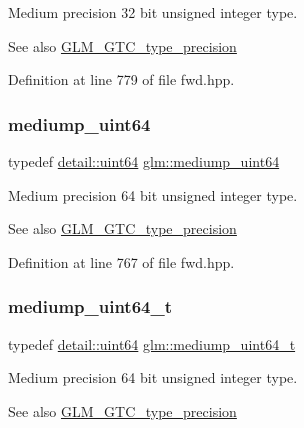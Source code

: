 Medium precision 32 bit unsigned integer type. \begin{DoxySeeAlso}{See also}
\mbox{\hyperlink{group__gtc__type__precision}{G\+L\+M\+\_\+\+G\+T\+C\+\_\+type\+\_\+precision}} 
\end{DoxySeeAlso}


Definition at line 779 of file fwd.\+hpp.

\mbox{\label{group__gtc__type__precision_ga6685788d15d0a973ee7c2460d0456dc1}} 
\subsubsection{\texorpdfstring{mediump\_uint64}{mediump\_uint64}}
{\footnotesize\ttfamily typedef \mbox{\hyperlink{namespaceglm_1_1detail_adec4b19bf4982125e122db2fe03c5810}{detail\+::uint64}} \mbox{\hyperlink{group__gtc__type__precision_ga6685788d15d0a973ee7c2460d0456dc1}{glm\+::mediump\+\_\+uint64}}}

Medium precision 64 bit unsigned integer type. \begin{DoxySeeAlso}{See also}
\mbox{\hyperlink{group__gtc__type__precision}{G\+L\+M\+\_\+\+G\+T\+C\+\_\+type\+\_\+precision}} 
\end{DoxySeeAlso}


Definition at line 767 of file fwd.\+hpp.

\mbox{\label{group__gtc__type__precision_gaa97354d3120a6dc029a5e9563723de18}} 
\subsubsection{\texorpdfstring{mediump\_uint64\_t}{mediump\_uint64\_t}}
{\footnotesize\ttfamily typedef \mbox{\hyperlink{namespaceglm_1_1detail_adec4b19bf4982125e122db2fe03c5810}{detail\+::uint64}} \mbox{\hyperlink{group__gtc__type__precision_gaa97354d3120a6dc029a5e9563723de18}{glm\+::mediump\+\_\+uint64\+\_\+t}}}

Medium precision 64 bit unsigned integer type. \begin{DoxySeeAlso}{See also}
\mbox{\hyperlink{group__gtc__type__precision}{G\+L\+M\+\_\+\+G\+T\+C\+\_\+type\+\_\+precision}} 
\end{DoxySeeAlso}



